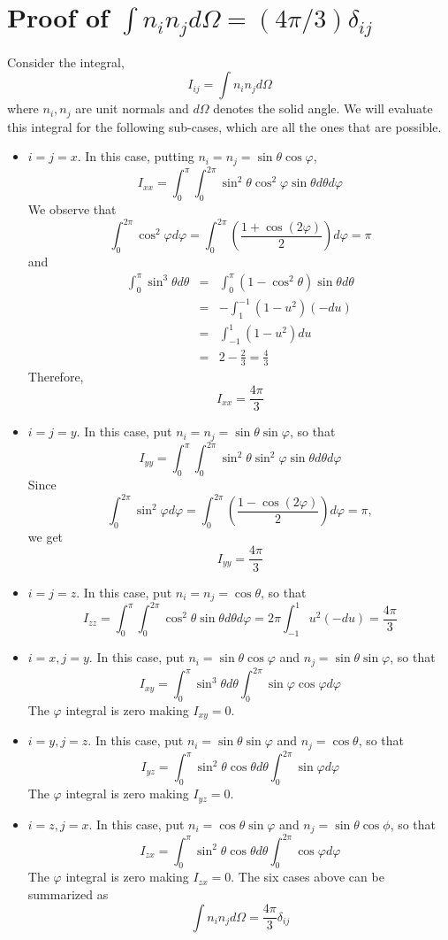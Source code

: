 \section{Proof of \texorpdfstring{$\int n_i n_j d\Omega = (4\pi/3)\delta_{ij}$}{}}
Consider the integral,
\[
I_{ij} = \int n_i n_j d\Omega
\]
where $n_i, n_j$ are unit normals and $d\Omega$ denotes the solid angle. We will evaluate this integral for the following sub-cases, which are all the ones that are possible.
\begin{itemize}
\item $i = j = x$. In this case, putting $n_i = n_j = \sin\theta\cos\varphi$,
\[
I_{xx} = \int_0^\pi\int_0^{2\pi} \sin^2\theta \cos^2\varphi \sin\theta d\theta d\varphi
\]
We observe that
\[
\int_0^{2\pi} \cos^2\varphi d\varphi = \int_0^{2\pi}\left(\frac{1 + \cos(2\varphi)}{2}\right)d\varphi = \pi
\]
and
\begin{eqnarray*}
\int_0^{\pi}\sin^3\theta d\theta &=& \int_0^\pi(1 - \cos^2\theta)\sin\theta d\theta \\
 &=& -\int_{1}^{-1} (1 - u^2)(-du) \\
 &=& \int_{-1}^1(1 - u^2)du \\
 &=& 2 - \frac{2}{3} = \frac{4}{3}
\end{eqnarray*}
Therefore,
\[
I_{xx} = \frac{4\pi}{3}
\]

\item $i = j = y$. In this case, put $n_i = n_j = \sin\theta\sin\varphi$, so that
\[
I_{yy} = \int_0^\pi\int_0^{2\pi} \sin^2\theta \sin^2\varphi \sin\theta d\theta d\varphi
\]
Since
\[
\int_0^{2\pi} \sin^2\varphi d\varphi = \int_0^{2\pi}\left(\frac{1 - \cos(2\varphi)}{2}\right)d\varphi = \pi,
\]
we get
\[
I_{yy} = \frac{4\pi}{3}
\]

\item $i = j = z$. In this case, put $n_i = n_j = \cos\theta$, so that
\[
I_{zz} = \int_0^\pi\int_0^{2\pi} \cos^2\theta \sin\theta d\theta d\varphi = 2\pi\int_{-1}^1 u^2 (-du) = \frac{4\pi}{3}
\]

\item $i = x, j = y$. In this case, put $n_i = \sin\theta\cos\varphi$ and $n_j = \sin\theta\sin\varphi$, so that
\[
I_{xy} = \int_0^{\pi}\sin^3\theta d\theta \int_0^{2\pi} \sin\varphi\cos\varphi d\varphi
\]
The $\varphi$ integral is zero making $I_{xy} = 0$.

\item $i = y, j = z$. In this case, put $n_i = \sin\theta\sin\varphi$ and $n_j = \cos\theta$, so that
\[
I_{yz} = \int_0^{\pi}\sin^2\theta\cos\theta d\theta \int_0^{2\pi} \sin\varphi d\varphi
\]
The $\varphi$ integral is zero making $I_{yz} = 0$.

\item $i = z, j = x$. In this case, put $n_i = \cos\theta\sin\varphi$ and $n_j = \sin\theta\cos\phi$, so that
\[
I_{zx} = \int_0^{\pi}\sin^2\theta\cos\theta d\theta \int_0^{2\pi} \cos\varphi d\varphi
\]
The $\varphi$ integral is zero making $I_{zx} = 0$.
The six cases above can be summarized as
\begin{equation}\label{c3sae1}
\int n_i n_j d\Omega = \frac{4\pi}{3}\delta_{ij}
\end{equation}
\end{itemize}

